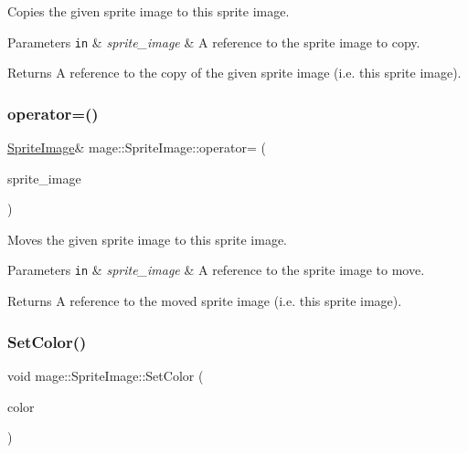 Copies the given sprite image to this sprite image.


\begin{DoxyParams}[1]{Parameters}
\mbox{\tt in}  & {\em sprite\+\_\+image} & A reference to the sprite image to copy. \\
\hline
\end{DoxyParams}
\begin{DoxyReturn}{Returns}
A reference to the copy of the given sprite image (i.\+e. this sprite image). 
\end{DoxyReturn}
\hypertarget{classmage_1_1_sprite_image_a9f83e728a93550f6b20bb4d500483171}{}\label{classmage_1_1_sprite_image_a9f83e728a93550f6b20bb4d500483171} 
\subsubsection{\texorpdfstring{operator=()}{operator=()}\hspace{0.1cm}{\footnotesize\ttfamily [2/2]}}
{\footnotesize\ttfamily \hyperlink{classmage_1_1_sprite_image}{Sprite\+Image}\& mage\+::\+Sprite\+Image\+::operator= (\begin{DoxyParamCaption}\item[{\hyperlink{classmage_1_1_sprite_image}{Sprite\+Image} \&\&}]{sprite\+\_\+image }\end{DoxyParamCaption})\hspace{0.3cm}{\ttfamily [delete]}}

Moves the given sprite image to this sprite image.


\begin{DoxyParams}[1]{Parameters}
\mbox{\tt in}  & {\em sprite\+\_\+image} & A reference to the sprite image to move. \\
\hline
\end{DoxyParams}
\begin{DoxyReturn}{Returns}
A reference to the moved sprite image (i.\+e. this sprite image). 
\end{DoxyReturn}
\hypertarget{classmage_1_1_sprite_image_ac061b1e201e24097d4b667b8fb53c232}{}\label{classmage_1_1_sprite_image_ac061b1e201e24097d4b667b8fb53c232} 
\subsubsection{\texorpdfstring{Set\+Color()}{SetColor()}\hspace{0.1cm}{\footnotesize\ttfamily [1/3]}}
{\footnotesize\ttfamily void mage\+::\+Sprite\+Image\+::\+Set\+Color (\begin{DoxyParamCaption}\item[{const \hyperlink{structmage_1_1_color}{Color} \&}]{color }\end{DoxyParamCaption})\hspace{0.3cm}{\ttfamily [noexcept]}}

